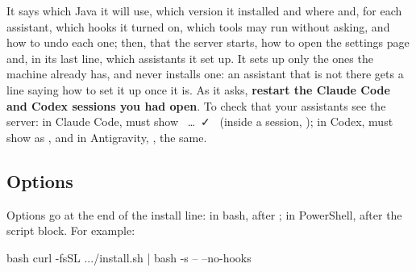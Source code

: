 \documentclass[11pt,a4paper]{article}
\begin{document}
It says which Java it will use, which version it installed and where and, for each assistant, which
hooks it turned on, which tools may run without asking, and how to undo each
one; then, that the server starts, how to open the settings page and, in its last
line, which assistants it set up. It sets up only the ones the
machine already has, and never installs one: an assistant that is not there
gets a line saying how to set it up once it is. As it asks,
\textbf{restart the Claude Code and Codex sessions you had open}. To check that
your assistants see the server: in Claude Code,  must
show ~\ldots~\textcolor{pbtip}{\faCheck}~ (inside
a session, ); in Codex,  must show
 as , and in Antigravity, , the
same.

\subsection{Options}

Options go at the end of the install line: in bash, after ;
in PowerShell, after the script block. For example:

\begin{command}{bash}
curl -fsSL .../install.sh | bash -s -- --no-hooks
\end{command}
\end{document}
